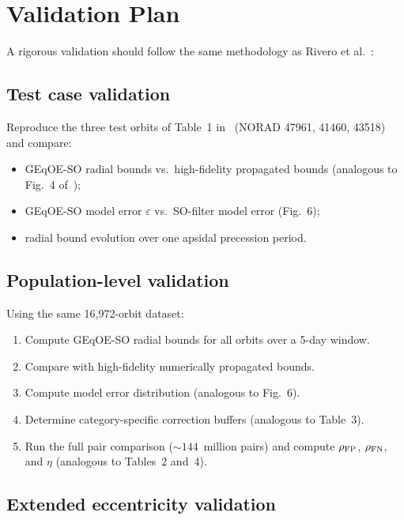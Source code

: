 \documentclass[11pt]{article}
\begin{document}
\section{Validation Plan}
\label{sec:validation}

A rigorous validation should follow the same methodology as
Rivero et al.~\cite{rivero2025}:

\subsection{Test case validation}

Reproduce the three test orbits of Table~1 in~\cite{rivero2025} (NORAD
47961, 41460, 43518) and compare:
\begin{itemize}
\item GEqOE-SO radial bounds vs.\ high-fidelity propagated bounds (analogous
to Fig.~4 of~\cite{rivero2025});
\item GEqOE-SO model error $\varepsilon$ vs.\ SO-filter model error
(Fig.~6);
\item radial bound evolution over one apsidal precession period.
\end{itemize}

\subsection{Population-level validation}

Using the same 16,972-orbit dataset:
\begin{enumerate}
\item Compute GEqOE-SO radial bounds for all orbits over a 5-day window.
\item Compare with high-fidelity numerically propagated bounds.
\item Compute model error distribution (analogous to Fig.~6).
\item Determine category-specific correction buffers (analogous to Table~3).
\item Run the full pair comparison ($\sim\!144$~million pairs) and compute
$\rho_{\rm FP}$, $\rho_{\rm FN}$, and $\eta$ (analogous to Tables~2 and~4).
\end{enumerate}

\subsection{Extended eccentricity validation}
\end{document}
